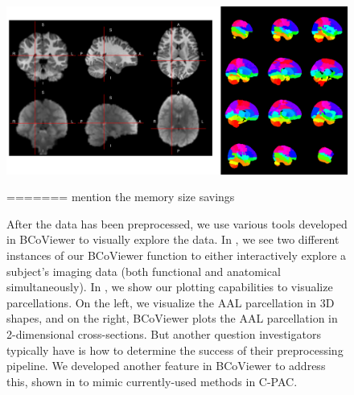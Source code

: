 \documentclass{nature}
\begin{document}
\begin{figure}[tb]
\centering
\includegraphics[width=400pt]{fig/brainconductor/BCoViewer.png}
\caption{(Left) An interactive imaging viewer in BCoViewer designed in R to mimic fslview. (Right) A parcellation plotter in BCoViewer. Each color represents a different parcel.}
\label{fig:features}
=======
{\color{red}mention the memory size savings}

After the data has been preprocessed, we use various tools developed in
BCoViewer
to visually explore the data. In , we see two different
instances
of our BCoViewer function to either interactively explore a subject's imaging
data (both
functional and anatomical simultaneously). 
In , we show our plotting capabilities to visualize parcellations.
On the left, we visualize the AAL parcellation in 3D shapes, and on the right, BCoViewer plots the AAL
parcellation in 2-dimensional cross-sections. But another question investigators typically
have is 
how to determine the success of their preprocessing pipeline. We developed
another feature
in BCoViewer to address this, shown in  to mimic
currently-used methods
in C-PAC.


\begin{figure}
\centering
\begin{subfigure}{.5\textwidth}
  \centering
 

\end{subfigure}
\end{figure}
\end{figure}
\end{document}
